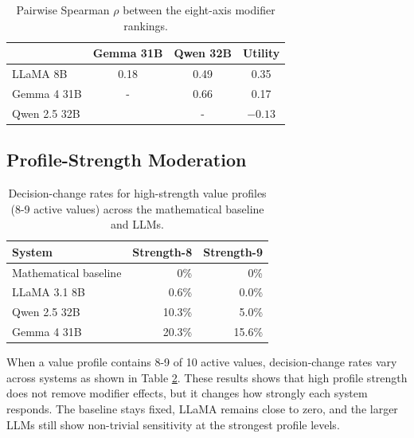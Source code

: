 \documentclass[11pt]{article}
\begin{document}
\begin{table}[h]
\centering
\small
\begin{tabular}{lccc}
\toprule
                  & Gemma 31B & Qwen 32B & Utility \\
\midrule
LLaMA 8B          & 0.18      & 0.49     & 0.35 \\
Gemma 4 31B       & -       & 0.66     & 0.17 \\
Qwen 2.5 32B      &           & -      & $-0.13$ \\
\bottomrule
\end{tabular}
\caption{Pairwise Spearman $\rho$ between the eight-axis modifier rankings. }
\label{tab:crossmodel-spearman}
\end{table}

\subsection{Profile-Strength Moderation}

\begin{table}[t]
\centering
\small
\begin{tabular}{lrr}
\hline
\textbf{System} & \textbf{Strength-8} & \textbf{Strength-9} \\
\hline
Mathematical baseline & 0\% & 0\% \\
LLaMA 3.1 8B & 0.6\% & 0.0\% \\
Qwen 2.5 32B & 10.3\% & 5.0\% \\
Gemma 4 31B & 20.3\% & 15.6\% \\
\hline
\end{tabular}
\caption{Decision-change rates for high-strength value profiles (8-9 active values) across the mathematical baseline and LLMs.}
\label{tab:high_strength_profiles}
\end{table}

When a value profile contains 8-9 of 10 active values, decision-change rates vary across systems as shown in Table \ref{tab:high_strength_profiles}.
These results shows that high profile strength does not remove modifier effects, but it changes how strongly each system responds. The baseline stays fixed, LLaMA remains close to zero, and the larger LLMs still show non-trivial sensitivity at the strongest profile levels.



\end{document}

